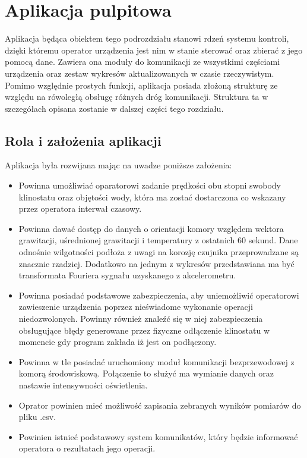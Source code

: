 \graphicspath{{./Aplikacja/images}}

\chapter{Aplikacja pulpitowa}

Aplikacja będąca obiektem tego podrozdziału stanowi rdzeń systemu kontroli, dzięki któremu operator urządzenia jest nim w stanie sterować oraz zbierać z jego pomocą dane. Zawiera ona moduły do komunikacji ze wszystkimi częściami urządzenia oraz zestaw wykresów aktualizowanych w czasie rzeczywistym. Pomimo względnie prostych funkcji, aplikacja posiada złożoną strukturę ze względu na rówoległą obsługę różnych dróg komunikacji. Struktura ta w szczegółach opisana zostanie  w dalszej części tego rozdziału.

\section{Rola i założenia aplikacji}

Aplikacja była rozwijana mając na uwadze poniższe założenia:
\begin{itemize}
	\item Powinna umożliwiać oparatorowi zadanie prędkości obu stopni swobody klinostatu oraz objętości wody, która ma zostać dostarczona co wskazany przez operatora interwał czasowy.
	\item Powinna dawać dostęp do danych o orientacji komory względem wektora grawitacji, uśrednionej grawitacji i temperatury z ostatnich 60 sekund. Dane odnośnie wilgotności podłoża z uwagi na korozję czujnika przeprowadzane są znacznie rzadziej. Dodatkowo na jednym z wykresów przedstawiana ma być transformata Fouriera sygnału uzyskanego z akcelerometru.
	\item Powinna posiadać podstawowe zabezpieczenia, aby uniemożliwić operatorowi zawieszenie urządzenia poprzez nieświadome wykonanie operacji niedozwolonych. Powinny również znaleźć się w niej zabezpieczenia obsługujące błędy generowane przez fizyczne odłączenie klinostatu w momencie gdy program zakłada iż jest on podłączony.
	\item Powinna w tle posiadać uruchomiony moduł komunikacji bezprzewodowej z komorą środowiskową. Połączenie to służyć ma wymianie danych oraz nastawie intensywności oświetlenia.
	\item Oprator powinien mieć możliwość zapisania zebranych wyników pomiarów do pliku .csv.
	\item Powinien istnieć podstawowy system komunikatów, który będzie informować operatora o rezultatach jego operacji.
\end{itemize}

